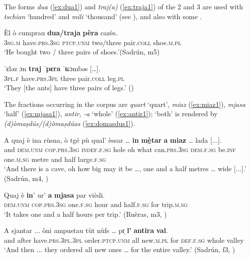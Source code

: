 The forms \textit{dua} (\ref{ex:dua1}) and \textit{traj(a)}  (\ref{ex:traja1}) of the  2 and 3 are used with \textit{tschian} `hundred' and \textit{mili} `thousand' (see ), and also with some .

\ea
\label{ex:dua1}
\gll Èl ò cumprau \textbf{dua/traja} \textbf{pèra} cazès.\\
\textsc{3sg.m} have.\textsc{prs.3sg} \textsc{ptcp.unm} two/three pair.\textsc{coll} shoe.\textsc{m.pl}\\
\glt `He bought two / three pairs of shoes.'(Sadrún, m5)
\z

\ea
\label{ex:traja1}
\gll    ˈɛləz ɔn \textbf{traj} \textbf{ˈpɛra} ˈʨɔmbəs […].\\
    \textsc{3pl.f} have.\textsc{prs.3pl} three pair.\textsc{coll} leg.\textsc{pl}\\
\glt `They [the ants] have three pairs of legs.' (\citealt[28]{Gartner1910})
\z

The fractions occurring in the corpus are \textit{quart} `quart', \textit{miaz} (\ref{ex:miaz1}), \textit{mjasa} ‘half’ (\ref{ex:mjasa1}), \textit{antir, -a} ‘whole’ (\ref{ex:antir1}); `both' is rendered by \textit{(d)òmaṣdús/(d)òmaṣdúas} (\ref{ex:domasdus1}).

\ea\label{ex:miaz1}
\gll A quaj è ina rùsna, ò tgé pù qual' èssar … \textbf{in} \textbf{m{\`e̱}tar} \textbf{a} \textbf{miaz} … lada [...].\\
and \textsc{dem.unm} \textsc{cop.prs.3sg} \textsc{indef.f.sg} hole oh what  can.\textsc{prs.3sg} \textsc{dem.f.sg} be.\textsc{inf} {} one.\textsc{m.sg} metre and half {} large.\textsc{f.sg}\\
\glt `And there is a cave, oh how big may it be …, one and a half metres … wide [...].' (Sadrún, m4, )
\z

\ea
\label{ex:mjasa1}
\gll Quaj è \textbf{in}’ ur’ \textbf{a} \textbf{mjasa} par vièdi.  \\
\textsc{dem.unm} \textsc{cop.prs.3sg} one.\textsc{f.sg} hour and half.\textsc{f.sg} for trip.\textsc{m.sg}\\
\glt `It takes one and a half hours per trip.' (Ruèras, m3, )
\z

\ea
\label{ex:antir1}
\gll  A sjantar ... òni ampustau tùt nùfs … pr̩ \textbf{l’} \textbf{antira} \textbf{val}.  \\
and after {} have.\textsc{prs.3pl.3pl} order.\textsc{ptcp.unm} all new.\textsc{m.pl} {} for \textsc{def.f.sg} whole valley \\
\glt `And then ... they ordered all new ones … for the entire valley.' (Sadrún, f3, )
\z

